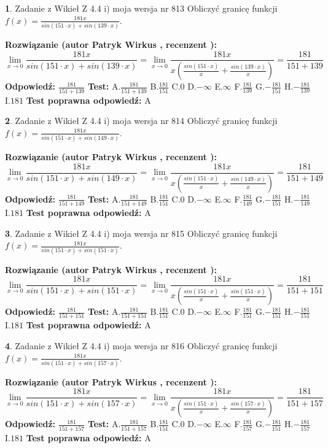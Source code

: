\documentclass[12pt, a4paper]{article}
\theoremstyle{definition} %
\newtheorem{zad}{}
\newcommand{\zadStart}[1]{\begin{zad}#1\newline}
\newcommand{\zadStop}{\end{zad}}
\newcommand{\rozwStart}[2]{\noindent \textbf{Rozwiązanie (autor #1 , recenzent #2): }\newline}
\newcommand{\rozwStop}{\newline}
\newcommand{\odpStart}{\noindent \textbf{Odpowiedź:}\newline}
\newcommand{\odpStop}{\newline}
\newcommand{\testStart}{\noindent \textbf{Test:}\newline}
\newcommand{\testStop}{\newline}
\newcommand{\kluczStart}{\noindent \textbf{Test poprawna odpowiedź:}\newline}
\newcommand{\kluczStop}{\newline}
\begin{document}
\zadStart{Zadanie z Wikieł Z 4.4 i) moja wersja nr 813}
Obliczyć granicę funkcji $f(x)=\frac{181x}{sin(151\cdot x) +sin(139\cdot x)}$.
\zadStop
\rozwStart{Patryk Wirkus}{}
$$\lim\limits_{x\to 0}\frac{181x}{sin(151\cdot x) +sin(139\cdot x)}=\lim\limits_{x\to 0}\frac{181x}{x(\frac{sin(151\cdot x)}{x}+\frac{sin(139\cdot x)}{x})}=\frac{181}{151+139}$$
\rozwStop
\odpStart
$\frac{181}{151+139}$
\odpStop
\testStart
A.$\frac{181}{151+139}$
B.$\frac{181}{151}$
C.$0$
D.$-\infty$
E.$\infty$
F.$\frac{181}{139}$
G.$-\frac{181}{151}$
H.$-\frac{181}{139}$
I.$181$
\testStop
\kluczStart
A
\kluczStop



\zadStart{Zadanie z Wikieł Z 4.4 i) moja wersja nr 814}
Obliczyć granicę funkcji $f(x)=\frac{181x}{sin(151\cdot x) +sin(149\cdot x)}$.
\zadStop
\rozwStart{Patryk Wirkus}{}
$$\lim\limits_{x\to 0}\frac{181x}{sin(151\cdot x) +sin(149\cdot x)}=\lim\limits_{x\to 0}\frac{181x}{x(\frac{sin(151\cdot x)}{x}+\frac{sin(149\cdot x)}{x})}=\frac{181}{151+149}$$
\rozwStop
\odpStart
$\frac{181}{151+149}$
\odpStop
\testStart
A.$\frac{181}{151+149}$
B.$\frac{181}{151}$
C.$0$
D.$-\infty$
E.$\infty$
F.$\frac{181}{149}$
G.$-\frac{181}{151}$
H.$-\frac{181}{149}$
I.$181$
\testStop
\kluczStart
A
\kluczStop



\zadStart{Zadanie z Wikieł Z 4.4 i) moja wersja nr 815}
Obliczyć granicę funkcji $f(x)=\frac{181x}{sin(151\cdot x) +sin(151\cdot x)}$.
\zadStop
\rozwStart{Patryk Wirkus}{}
$$\lim\limits_{x\to 0}\frac{181x}{sin(151\cdot x) +sin(151\cdot x)}=\lim\limits_{x\to 0}\frac{181x}{x(\frac{sin(151\cdot x)}{x}+\frac{sin(151\cdot x)}{x})}=\frac{181}{151+151}$$
\rozwStop
\odpStart
$\frac{181}{151+151}$
\odpStop
\testStart
A.$\frac{181}{151+151}$
B.$\frac{181}{151}$
C.$0$
D.$-\infty$
E.$\infty$
F.$\frac{181}{151}$
G.$-\frac{181}{151}$
H.$-\frac{181}{151}$
I.$181$
\testStop
\kluczStart
A
\kluczStop



\zadStart{Zadanie z Wikieł Z 4.4 i) moja wersja nr 816}
Obliczyć granicę funkcji $f(x)=\frac{181x}{sin(151\cdot x) +sin(157\cdot x)}$.
\zadStop
\rozwStart{Patryk Wirkus}{}
$$\lim\limits_{x\to 0}\frac{181x}{sin(151\cdot x) +sin(157\cdot x)}=\lim\limits_{x\to 0}\frac{181x}{x(\frac{sin(151\cdot x)}{x}+\frac{sin(157\cdot x)}{x})}=\frac{181}{151+157}$$
\rozwStop
\odpStart
$\frac{181}{151+157}$
\odpStop
\testStart
A.$\frac{181}{151+157}$
B.$\frac{181}{151}$
C.$0$
D.$-\infty$
E.$\infty$
F.$\frac{181}{157}$
G.$-\frac{181}{151}$
H.$-\frac{181}{157}$
I.$181$
\testStop
\kluczStart
A
\kluczStop
\end{document}
